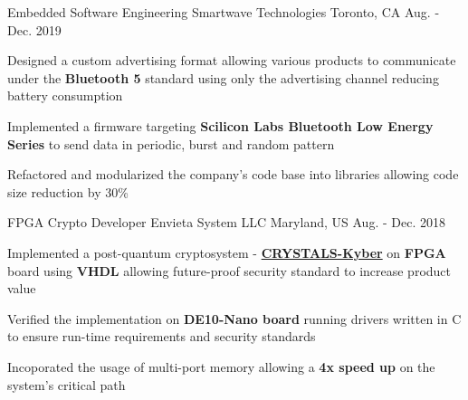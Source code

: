 


\begin{cventries}


\cventry
{Embedded Software Engineering} %
{Smartwave Technologies} %
{Toronto, CA} %
{Aug. - Dec. 2019} %
{ %
\begin{cvitems}
\item {
    Designed a custom advertising format allowing
    various products to communicate under the 
    \textbf{Bluetooth 5} standard using only the advertising channel
    reducing battery consumption 
}
\item {
    Implemented a firmware targeting
    \textbf{Scilicon Labs Bluetooth Low Energy Series}
    to send data in periodic, burst and random pattern
}
\item {
    Refactored and modularized the company's code base 
    into libraries allowing code size reduction by 30\%
}
\end{cvitems}
}


\cventry
{FPGA Crypto Developer} %
{Envieta System LLC} %
{Maryland, US} %
{Aug. - Dec. 2018} %
{ %
\begin{cvitems}
\item {
    Implemented a post-quantum cryptosystem - 
    \textbf{\href{https://pq-crystals.org/}{CRYSTALS-Kyber}} 
    on \textbf{FPGA} board using \textbf{VHDL} allowing
    future-proof security standard to increase product value
}
\item {
    Verified the implementation on 
    \textbf{DE10-Nano board} running drivers 
    written in C to ensure run-time requirements 
    and security standards
}
\item {
    Incoporated the usage of multi-port memory allowing 
    a \textbf{4x speed up} on the system’s critical path
}
\end{cvitems}
}


\end{cventries}

